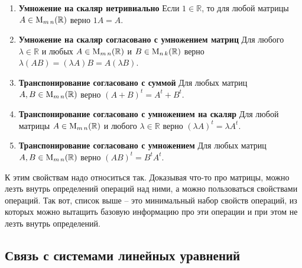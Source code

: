 \begin{enumerate}
\item {\bf Умножение на скаляр нетривиально} Если $1\in\mathbb R$, то для любой матрицы $A\in \operatorname{M}_{m\,n}(\mathbb R)$ верно $1 A = A$.

\item {\bf Умножение на скаляр согласовано с умножением матриц} Для любого $\lambda \in \mathbb R$ и любых $A\in\operatorname{M}_{m\,n}(\mathbb R)$ и $B\in\operatorname{M}_{n\,k}(\mathbb R)$ верно $\lambda(AB) = (\lambda A)B = A (\lambda B)$.


\item {\bf Транспонирование согласовано с суммой} Для любых матриц $A, B\in\operatorname{M}_{m\,n}(\mathbb R)$ верно $(A+B)^t = A^t + B^t$.

\item {\bf Транспонирование согласовано с умножением на скаляр} Для любой матрицы $A\in\operatorname{M}_{m\,n}(\mathbb R)$ и любого $\lambda\in\mathbb R$ верно $(\lambda A)^t = \lambda A^t$.

\item {\bf Транспонирование согласовано с умножением} Для любых матриц $A, B\in\operatorname{M}_{m\,n}(\mathbb R)$ верно $(AB)^t = B^t A^t$.
\end{enumerate}

К этим свойствам надо относиться так. Доказывая что-то про матрицы, можно лезть внутрь определений операций над ними, а можно пользоваться свойствами операций. Так вот, список выше -- это минимальный набор свойств операций, из которых можно вытащить базовую информацию про эти операции и при этом не лезть внутрь определений.


\subsection{Связь с системами линейных уравнений}

